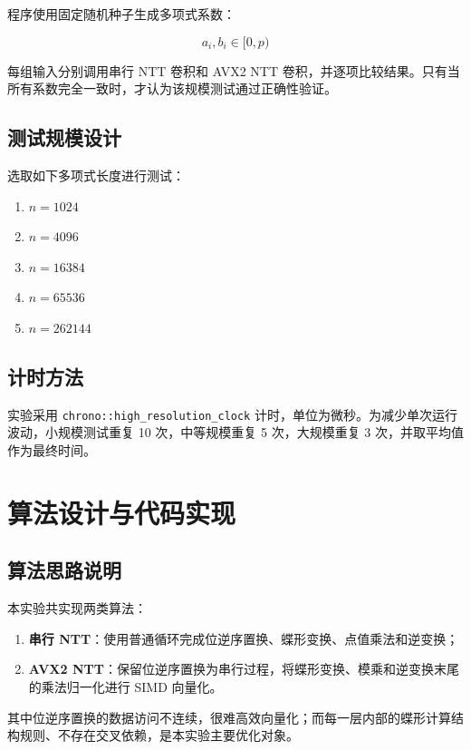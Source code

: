 \documentclass[a4paper,12pt]{ctexart}
\begin{document}
程序使用固定随机种子生成多项式系数：

\begin{equation}
a_i,b_i\in[0,p)
\end{equation}

每组输入分别调用串行 NTT 卷积和 AVX2 NTT 卷积，并逐项比较结果。只有当所有系数完全一致时，才认为该规模测试通过正确性验证。

\subsection{测试规模设计}

选取如下多项式长度进行测试：

\begin{enumerate}
  \item $n=1024$
  \item $n=4096$
  \item $n=16384$
  \item $n=65536$
  \item $n=262144$
\end{enumerate}


\subsection{计时方法}

实验采用 \texttt{chrono::high\_resolution\_clock} 计时，单位为微秒。为减少单次运行波动，小规模测试重复 10 次，中等规模重复 5 次，大规模重复 3 次，并取平均值作为最终时间。

\section{算法设计与代码实现}

\subsection{算法思路说明}

本实验共实现两类算法：

\begin{enumerate}
  \item \textbf{串行 NTT}：使用普通循环完成位逆序置换、蝶形变换、点值乘法和逆变换；
  \item \textbf{AVX2 NTT}：保留位逆序置换为串行过程，将蝶形变换、模乘和逆变换末尾的乘法归一化进行 SIMD 向量化。
\end{enumerate}

其中位逆序置换的数据访问不连续，很难高效向量化；而每一层内部的蝶形计算结构规则、不存在交叉依赖，是本实验主要优化对象。
\end{document}
